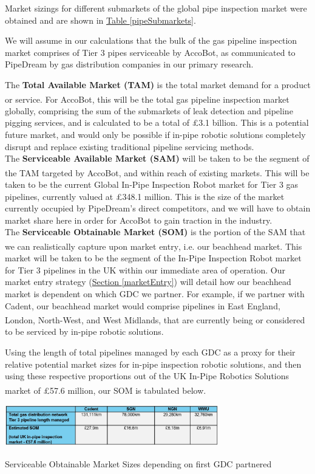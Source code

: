 \documentclass[11pt]{article}		%
\newcommand{\supercite}[1]{\textsuperscript{\cite{#1}}}		%
\newcommand{\tableref}[1]{\hyperref[#1]{Table \ref*{#1}}}     %
\newcommand{\sectref}[1]{\hyperref[#1]{Section \ref*{#1}}}     %
\begin{document}
        Market sizings for different submarkets of the global pipe inspection market were obtained and are shown in \tableref{pipeSubmarkets}. 

    We will assume in our calculations that the bulk of the gas pipeline inspection market comprises of Tier 3 pipes serviceable by AccoBot, as communicated to PipeDream by gas distribution companies in our primary research.
    
    \begin{floatingfigure}[r]{0\textwidth} \end{floatingfigure}
    
    The \textbf{Total Available Market (TAM)} is the total market demand for a product or service\supercite{tamsamsom}. For AccoBot, this will be the total gas pipeline inspection market globally, comprising the sum of the submarkets of leak detection and pipeline pigging services, and is calculated to be a total of £3.1 billion. This is a potential future market, and would only be possible if in-pipe robotic solutions completely disrupt and replace existing traditional pipeline servicing methods. \\
    The \textbf{Serviceable Available Market (SAM) }will be taken to be the segment of the TAM targeted by AccoBot, and within reach of existing markets\supercite{tamsamsom}. This will be taken to be the current Global In-Pipe Inspection Robot market for Tier 3 gas pipelines, currently valued at £348.1 million.  This is the size of the market currently occupied by PipeDream’s direct competitors, and we will have to obtain market share here in order for AccoBot to gain traction in the industry.\\
    The \textbf{Serviceable Obtainable Market (SOM)} is the portion of the SAM that we can realistically capture upon market entry\supercite{tamsamsom}, i.e. our beachhead market. This market will be taken to be the segment of the In-Pipe Inspection Robot market for Tier 3 pipelines in the UK within our immediate area of operation. Our market entry strategy (\sectref{marketEntry}) will detail how our beachhead market is dependent on which GDC we partner. For example, if we partner with Cadent, our beachhead market would comprise pipelines in East England, London, North-West, and West Midlands\supercite{cadentarea}, that are currently being or considered to be serviced by in-pipe robotic solutions. 
    
    Using the length of total pipelines managed by each GDC as a proxy for their relative potential market sizes for in-pipe inspection robotic solutions, and then using these respective proportions out of the UK In-Pipe Robotics Solutions market of £57.6 million\supercite{inpipemkt}, our SOM is tabulated below. 
		\begin{table}[h]
			\centering
			\includegraphics[width=0.7\textwidth]{SOM.jpg}
			\caption{Serviceable Obtainable Market Sizes depending on first GDC partnered\supercite{ltd}}
			\label{SOM}
 		\end{table}
 		
\end{document}
